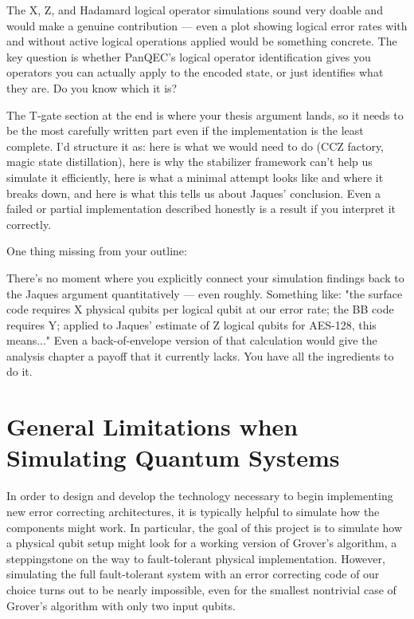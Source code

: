 {The X, Z, and Hadamard logical operator simulations sound very doable and would make a genuine contribution — even a plot showing logical error rates with and without active logical operations applied would be something concrete. The key question is whether PanQEC's logical operator identification gives you operators you can actually apply to the encoded state, or just identifies what they are. Do you know which it is?

The T-gate section at the end is where your thesis argument lands, so it needs to be the most carefully written part even if the implementation is the least complete. I'd structure it as: here is what we would need to do (CCZ factory, magic state distillation), here is why the stabilizer framework can't help us simulate it efficiently, here is what a minimal attempt looks like and where it breaks down, and here is what this tells us about Jaques' conclusion. Even a failed or partial implementation described honestly is a result if you interpret it correctly.

One thing missing from your outline:

There's no moment where you explicitly connect your simulation findings back to the Jaques argument quantitatively — even roughly. Something like: "the surface code requires X physical qubits per logical qubit at our error rate; the BB code requires Y; applied to Jaques' estimate of Z logical qubits for AES-128, this means..." Even a back-of-envelope version of that calculation would give the analysis chapter a payoff that it currently lacks. You have all the ingredients to do it.
}

\chapter{General Limitations when Simulating Quantum Systems}\label{chap:simulation_limitations}
In order to design and develop the technology necessary to begin implementing new error correcting architectures, it is typically helpful to simulate how the components might work. In particular, the goal of this project is to simulate how a physical qubit setup might look for a working version of Grover's algorithm, a steppingstone on the way to fault-tolerant physical implementation. However, simulating the full fault-tolerant system with an error correcting code of our choice turns out to be nearly impossible, even for the smallest nontrivial case of Grover's algorithm with only two input qubits.

